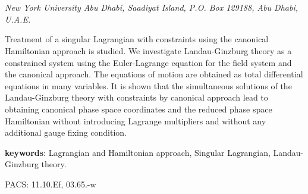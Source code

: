 \documentclass[12pt]{article}
\begin{document}
 \hfill\break
\begin{center}\\

\vspace{1.0cm}{Walaa I.\ Eshraim}\\
{\textit{New York University Abu Dhabi, Saadiyat Island, P.O. Box 129188, Abu Dhabi, U.A.E.}}

\end {center}

\begin{center}
\vspace{1.3cm}{\bf
 Abstract}\end{center} \vspace{0.4cm} 
 Treatment of a singular Lagrangian with constraints using the canonical Hamiltonian approach is studied. We investigate Landau-Ginzburg theory as a constrained system using the Euler-Lagrange equation for the field system and the canonical approach. The equations of motion are obtained as total differential equations in many variables. It is shown that the simultaneous solutions of the Landau-Ginzburg theory with constraints by canonical approach lead to obtaining canonical phase space coordinates and the reduced phase space Hamiltonian without introducing Lagrange multipliers and without any additional gauge fixing condition.
\begin{center}{\bf{keywords}}: Lagrangian and Hamiltonian approach, Singular Lagrangian, Landau-Ginzburg theory.\\
\end{center}
PACS: 11.10.Ef, 03.65.-w\\

\newpage
\end{document}
